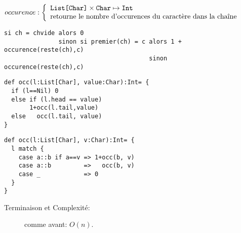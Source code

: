 \documentclass[10pt]{article}\usepackage[nu]{esial}
\begin{document}
\begin{Question}
  $occurence: \left\{
    \begin{array}{l}
      \text{\texttt{List[Char]}}\times \text{\texttt{Char}}\mapsto \text{\texttt{Int}}\\
      \text{retourne le nombre d'occurences du caractère dans la chaîne}
    \end{array}\right.$  
\end{Question}
\begin{Reponse}
  \begin{Verbatim}[label=occurences(ch\quotesinglbase c)]
si ch = chvide alors 0
               sinon si premier(ch) = c alors 1 + occurence(reste(ch),c)
                                        sinon     occurence(reste(ch),c)    
  \end{Verbatim}

\noindent
  \begin{minipage}{.49\linewidth}
  \begin{Verbatim}
def occ(l:List[Char], value:Char):Int= {
  if (l==Nil) 0
  else if (l.head == value) 
       1+occ(l.tail,value)
  else   occ(l.tail, value)
}

  \end{Verbatim}    
  \end{minipage}
  \begin{minipage}{.49\linewidth}
  \begin{Verbatim}[numbers=right]
def occ(l:List[Char], v:Char):Int= {
  l match {
    case a::b if a==v => 1+occ(b, v)
    case a::b         =>   occ(b, v)
    case _            => 0
  }
}
  \end{Verbatim}        
  \end{minipage}
  \begin{description}
  \item[Terminaison et Complexité:] comme avant: $O(n)$. 
  \end{description}
\end{Reponse}
\end{document}
